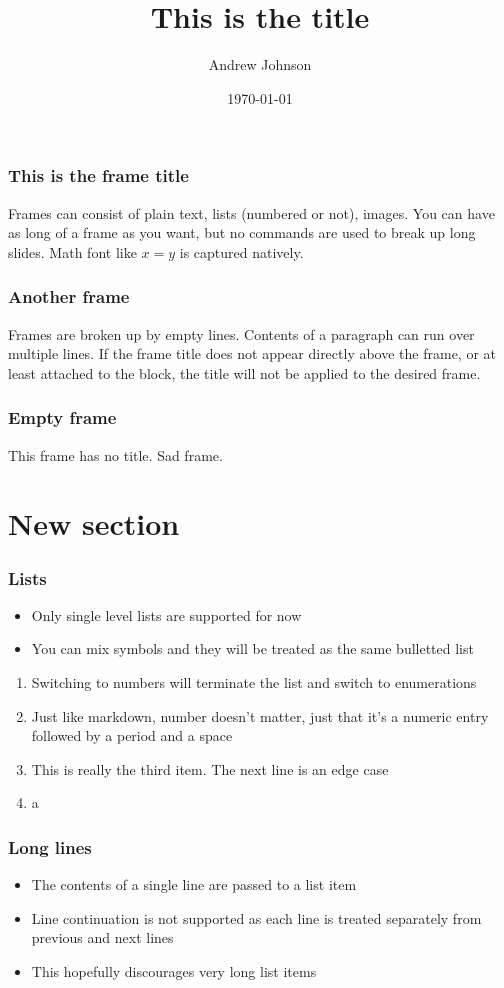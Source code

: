 \documentclass{beamer}
\author{Andrew Johnson}
\date{\today}
\title{This is the title}
\begin{document}
\frame{\titlepage}
\frame{\tableofcontents}

\begin{frame}
\frametitle{This is the frame title}
Frames can consist of plain text, lists (numbered or not), images.
You can have as long of a frame as you want, but no commands
are used to break up long slides.
Math font like $x=y$ is captured natively.
\end{frame}

\begin{frame}
\frametitle{Another frame}
Frames are broken up by empty lines. Contents of a paragraph
can run over multiple lines. If the frame title does not
appear directly above the frame, or at least attached to the block,
the title will not be applied to the desired frame.
\end{frame}

\begin{frame}
\frametitle{Empty frame}
\end{frame}

\begin{frame}
This frame has no title. 
Sad frame.
\end{frame}

\section{New section}

\begin{frame}
\frametitle{Lists}
\begin{itemize}
\item{Only single level lists are supported for now}
\item{You can mix symbols and they will be treated as the same bulletted list}
\end{itemize}
\begin{enumerate}
\item{Switching to numbers will terminate the list and switch to enumerations}
\item{Just like markdown, number doesn't matter, just that it's a numeric entry followed by a period and a space}
\item{This is really the third item. The next line is an edge case}
\item{a}
\end{enumerate}
\end{frame}

\begin{frame}
\frametitle{Long lines}
\begin{itemize}
\item{The contents of a single line are passed to a list item}
\item{Line continuation is not supported as each line is treated separately from previous and next lines}
\item{This hopefully discourages very long list items}
\end{itemize}
\end{frame}
\end{document}
